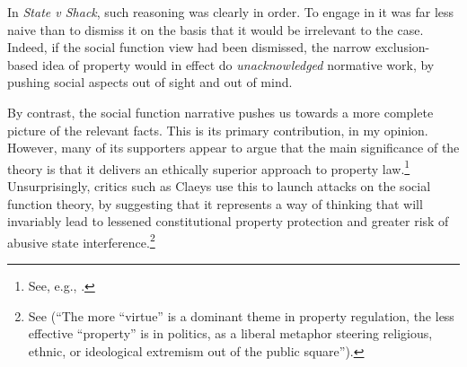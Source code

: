 {In {\it State v Shack}, such reasoning was clearly in order. To engage in it was far less naive than to dismiss it on the basis that it would be irrelevant to the case. Indeed, if the social function view had been dismissed, the narrow exclusion-based idea of property would in effect do {\it unacknowledged} normative work, by pushing social aspects out of sight and out of mind.

By contrast, the social function narrative pushes us towards a more complete picture of the relevant facts. This is its primary contribution, in my opinion. However, many of its supporters appear to argue that the main significance of the theory is that it delivers an ethically superior approach to property law.\footnote{See, e.g., \cite{penalver09}.} Unsurprisingly, critics such as Claeys use this to launch attacks on the social function theory, by suggesting that it represents a way of thinking that will invariably lead to lessened constitutional property protection and greater risk of abusive state interference.\footnote{See \cite{claeys09} (``The more ``virtue'' is a dominant theme in property regulation, the less effective ``property'' is in politics, as a liberal metaphor steering religious, ethnic, or ideological extremism out of the public square'').} %


}
